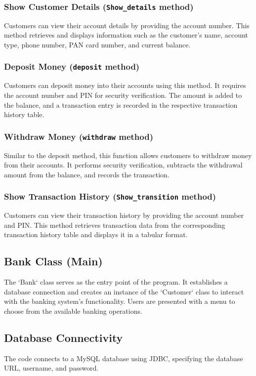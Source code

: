 \documentclass{article}
\begin{document}
\subsubsection{Show Customer Details (\texttt{Show\_details} method)}
Customers can view their account details by providing the account number. This method retrieves and displays information such as the customer's name, account type, phone number, PAN card number, and current balance.

\subsubsection{Deposit Money (\texttt{deposit} method)}
Customers can deposit money into their accounts using this method. It requires the account number and PIN for security verification. The amount is added to the balance, and a transaction entry is recorded in the respective transaction history table.

\subsubsection{Withdraw Money (\texttt{withdraw} method)}
Similar to the deposit method, this function allows customers to withdraw money from their accounts. It performs security verification, subtracts the withdrawal amount from the balance, and records the transaction.

\subsubsection{Show Transaction History (\texttt{Show\_transition} method)}
Customers can view their transaction history by providing the account number and PIN. This method retrieves transaction data from the corresponding transaction history table and displays it in a tabular format.

\subsection{Bank Class (Main)}
The `Bank` class serves as the entry point of the program. It establishes a database connection and creates an instance of the `Customer` class to interact with the banking system's functionality. Users are presented with a menu to choose from the available banking operations.

\subsection{Database Connectivity}
The code connects to a MySQL database using JDBC, specifying the database URL, username, and password.
\end{document}

